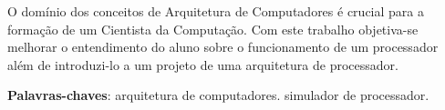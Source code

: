 \documentclass[
	12pt,				%
	oneside,			%
	a4paper,			%
	english,			%
	french,				%
	spanish,			%
	brazil,				%
	]{abntex2}
\begin{document}
{%





\setlength{\absparsep}{18pt} %
\begin{resumo}
 O domínio dos conceitos de Arquitetura de Computadores é crucial para a
 formação de um Cientista da Computação. Com este trabalho objetiva-se melhorar
 o entendimento do aluno sobre o funcionamento de um processador além de
 introduzi-lo a um projeto de uma arquitetura de processador.

 \noindent
 \textbf{Palavras-chaves}: arquitetura de computadores. simulador de processador.
\end{resumo}

\listoffigures*
\cleardoublepage

\listoftables*
\cleardoublepage


}
\end{document}
